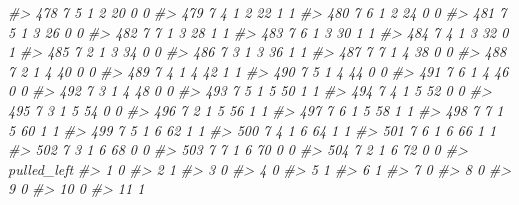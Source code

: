 \documentclass[]{book}
\newenvironment{Shaded}{\begin{snugshade}}{\end{snugshade}}
\newcommand{\CommentTok}[1]{\textcolor[rgb]{0.56,0.35,0.01}{\textit{#1}}}
\begin{document}
\begin{Shaded}
\begin{Highlighting}[]
\CommentTok{#> 478     7         5         1     2    20           0            0}
\CommentTok{#> 479     7         4         1     2    22           1            1}
\CommentTok{#> 480     7         6         1     2    24           0            0}
\CommentTok{#> 481     7         5         1     3    26           0            0}
\CommentTok{#> 482     7         7         1     3    28           1            1}
\CommentTok{#> 483     7         6         1     3    30           1            1}
\CommentTok{#> 484     7         4         1     3    32           0            1}
\CommentTok{#> 485     7         2         1     3    34           0            0}
\CommentTok{#> 486     7         3         1     3    36           1            1}
\CommentTok{#> 487     7         7         1     4    38           0            0}
\CommentTok{#> 488     7         2         1     4    40           0            0}
\CommentTok{#> 489     7         4         1     4    42           1            1}
\CommentTok{#> 490     7         5         1     4    44           0            0}
\CommentTok{#> 491     7         6         1     4    46           0            0}
\CommentTok{#> 492     7         3         1     4    48           0            0}
\CommentTok{#> 493     7         5         1     5    50           1            1}
\CommentTok{#> 494     7         4         1     5    52           0            0}
\CommentTok{#> 495     7         3         1     5    54           0            0}
\CommentTok{#> 496     7         2         1     5    56           1            1}
\CommentTok{#> 497     7         6         1     5    58           1            1}
\CommentTok{#> 498     7         7         1     5    60           1            1}
\CommentTok{#> 499     7         5         1     6    62           1            1}
\CommentTok{#> 500     7         4         1     6    64           1            1}
\CommentTok{#> 501     7         6         1     6    66           1            1}
\CommentTok{#> 502     7         3         1     6    68           0            0}
\CommentTok{#> 503     7         7         1     6    70           0            0}
\CommentTok{#> 504     7         2         1     6    72           0            0}
\CommentTok{#>     pulled_left}
\CommentTok{#> 1             0}
\CommentTok{#> 2             1}
\CommentTok{#> 3             0}
\CommentTok{#> 4             0}
\CommentTok{#> 5             1}
\CommentTok{#> 6             1}
\CommentTok{#> 7             0}
\CommentTok{#> 8             0}
\CommentTok{#> 9             0}
\CommentTok{#> 10            0}
\CommentTok{#> 11            1}

\end{Highlighting}
\end{Shaded}
\end{document}
